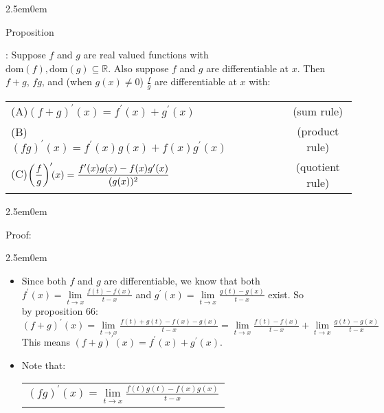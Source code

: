 \documentclass{book}
\newcommand{\hTwo}{%
   \color{MidnightBlue}%
   \fontsize{13}{15}\selectfont%
}
\newcommand{\hThree}{%
   \color{PineGreen!85!Orange}
   \fontsize{13}{15}\selectfont%
}
\newcommand{\hFour}{%
   \color{Cerulean}
   \fontsize{12}{14}\selectfont%
}
\newenvironment{myIndent}{%
   \begin{adjustwidth}{2.5em}{0em}%
}{%
   \end{adjustwidth}%
}
\newcommand{\domain}[1]{\mathrm{dom}(#1)}
\newcounter{PropNumber}
\newcommand{\propCount}[1][1]{%
   \addtocounter{PropNumber}{#1}%
   \thePropNumber%
}
\newcommand{\retTwo}{\hfill\bigbreak}
\begin{document}
\newpage

{\begin{myIndent}\hTwo
   Proposition \propCount: Suppose $f$ and $g$ are real valued functions with\\ $\domain{f}, \domain{g} \subseteq \mathbb{R}$. Also suppose $f$ and $g$ are differentiable at $x$. Then\\ $f + g$, $fg$, and (when $g(x) \neq 0$) $\frac{f}{g}$ are differentiable at $x$ with:\\
   
   \begin{tabular}{l c c c c c}
      (A)\quad\quad $(f + g)^\prime(x) = f^\prime(x) + g^\prime(x)$ & &&&&{\hFour(sum rule)} \\ [4pt]
      (B)\quad\quad $(fg)^\prime(x) = f^\prime(x)g(x) + f(x)g^\prime(x)$ & &&&& {\hFour(product rule)} \\ [4pt]
      (C)\quad\quad $\left(\dfrac{f}{g}\right)^\prime\hspace{-0.3em}(x) = \dfrac{f^\prime(x)g(x) - f(x)g^\prime(x)}{(g(x))^2}$ & &&&& {\hFour(quotient rule)}
   \end{tabular}\retTwo

   \begin{myIndent}\hThree
      Proof:
      \begin{myIndent}
         \begin{itemize}
            \item[(A)] Since both $f$ and $g$ are differentiable, we know that both\\ $f^\prime(x) = \lim\limits_{t\rightarrow x}\frac{f(t) - f(x)}{t - x}$ and $g^\prime(x) = \lim\limits_{t\rightarrow x}\frac{g(t) - g(x)}{t - x}$ exist. So\\ by proposition 66:\\ [-6pt]
            
            \hspace{-1.5em}${(f + g)^\prime(x) = \lim\limits_{t\rightarrow x}\frac{f(t) + g(t) - f(x) - g(x)}{t-x} = \lim\limits_{t\rightarrow x}\frac{f(t) - f(x)}{t - x} + \lim\limits_{t\rightarrow x}\frac{g(t) - g(x)}{t - x}}$\\ [-6pt]

            This means $(f + g)^\prime(x) = f^\prime(x) + g^\prime(x)$.\\ [6pt]

            \item[(B)] Note that:\\
            \begin{tabular}{l}
               $(fg)^\prime(x) = \lim\limits_{t\rightarrow x}\frac{f(t)g(t) - f(x)g(x)}{t-x}$ \\


\end{tabular}
\end{itemize}
\end{myIndent}
\end{myIndent}
\end{myIndent}}
\end{document}
